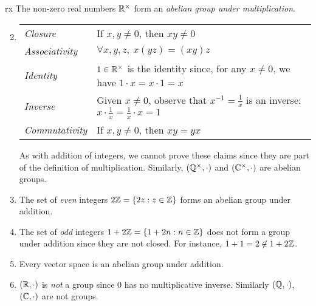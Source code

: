 \begin{examples}{}{rx}
	\exstart The non-zero real numbers $\mathbb{R}^\times$ form an \emph{abelian group under multiplication}.\vspace{-2pt}
	\begin{enumerate}\setcounter{enumi}{1}
	  \item[]\renewcommand{\arraystretch}{1.15}
		\begin{tabular}{@{}ll}
			\emph{Closure}&If $x,y\neq 0$, then $xy\neq 0$\\
			\emph{Associativity}&$\forall x,y,z,\ x(yz)=(xy)z$\\
			\emph{Identity}&$1\in\mathbb{R}^\times$ is the identity since, for any $x\neq 0$, we have $1\cdot x=x\cdot 1=x$\\
			\emph{Inverse}&Given $x\neq 0$, observe that $x^{-1}=\frac 1x$ is an inverse: $x\cdot \frac 1x=\frac 1x\cdot x=1$\\
			\emph{Commutativity}&If $x,y\neq 0$, then $xy=yx$
		\end{tabular}\smallbreak
		As with addition of integers, we cannot prove these claims since they are part of the definition of multiplication.	Similarly, $(\mathbb{Q}^\times,\cdot)$ and $(\mathbb{C}^\times,\cdot)$ are abelian groups.
		
		\goodbreak
		  
	  \item The set of \emph{even} integers $2\mathbb{Z}=\{2z:z\in\mathbb{Z}\}$ forms an abelian group under addition.
	  
	  \item The set of \emph{odd} integers $1+2\mathbb{Z}=\{1+2n:n\in\mathbb{Z}\}$ does not form a group under addition since they are not closed. For instance, $1+1=2\not\in 1+2\mathbb{Z}$.
	  
	  \item Every vector space is an abelian group under addition.
		
		\item $(\mathbb{R},\cdot)$ is \emph{not} a group since $0$ has no multiplicative inverse. Similarly $(\mathbb{Q},\cdot)$, $(\mathbb{C},\cdot)$ are not groups.
		

\end{enumerate}
\end{examples}
